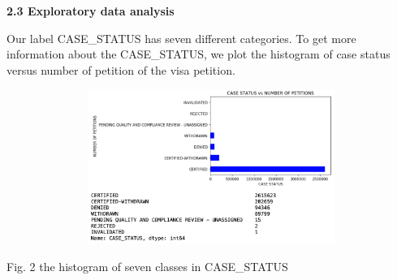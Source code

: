 \documentclass[12pt]{article}
\begin{document}
\begin{justify}
\textbf{2.3 Exploratory data analysis}
\end{justify}\par

\begin{justify}
\tab Our label CASE\_STATUS has seven different categories. To get more information about the CASE\_STATUS, we plot the histogram of case status versus number of petition of the visa petition. 
\end{justify}\par




\begin{figure}[H]
	\begin{Center}
		\includegraphics[width=4.89in,height=1.98in]{./media/image5.png}
	\end{Center}
\end{figure}



\par

\begin{Center}
{\fontsize{8pt}{9.6pt}\selectfont Fig. 2 the histogram of seven classes in CASE\_STATUS\par}
\end{Center}\par


\vspace{\baselineskip}


\end{document}
